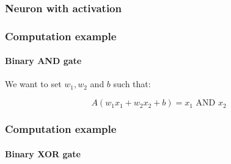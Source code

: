 \documentclass[9pt]{beamer}
\begin{document}
\begin{frame}
  \frametitle{Neuron with activation}

  \begin{center}
    \scalebox{0.6}{
      
    }
  \end{center}


\end{frame}

\begin{frame}
  \frametitle{Computation example}

  \framesubtitle{Binary AND gate}

  \begin{center}
    \scalebox{1}{
      
    }
  \end{center}

  We want to set $w_{1}, w_{2}$ and $b$ such that:

  \[
  A(w_{1}x_{1} + w_{2}x_{2} + b) = x_{1} \text{ AND } x_{2}
  \]


\end{frame}

\begin{frame}
  \frametitle{Computation example}

  \framesubtitle{Binary XOR gate}

  \begin{center}
    \scalebox{0.7}{
      
    }
  \end{center}
\end{frame}
\end{document}
